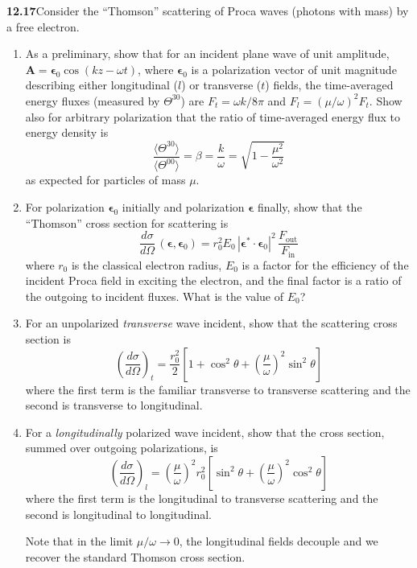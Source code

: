 \par\bigskip
\noindent\textbf{12.17}\quad Consider the ``Thomson'' scattering of Proca waves (photons with mass) by a free electron.
\begin{enumerate}
\item[(a)] As a preliminary, show that for an incident plane wave of unit amplitude, $\mathbf{A}=\boldsymbol{\epsilon}_{0}\cos(kz-\omega t)$, where $\boldsymbol{\epsilon}_{0}$ is a polarization vector of unit magnitude describing either longitudinal ($l$) or transverse ($t$) fields, the time-averaged energy fluxes (measured by $\Theta^{30}$) are $F_{t}=\omega k/8\pi$ and $F_{l}=(\mu/\omega)^{2}F_{t}$. Show also for arbitrary polarization that the ratio of time-averaged energy flux to energy density is
\[
\frac{\langle\Theta^{30}\rangle}{\langle\Theta^{00}\rangle}=\beta=\frac{k}{\omega}=\sqrt{1-\frac{\mu^{2}}{\omega^{2}}}
\]
as expected for particles of mass $\mu$.
\item[(b)] For polarization $\boldsymbol{\epsilon}_{0}$ initially and polarization $\boldsymbol{\epsilon}$ finally, show that the ``Thomson'' cross section for scattering is
\[
\frac{d\sigma}{d\Omega}\,(\boldsymbol{\epsilon},\boldsymbol{\epsilon}_{0})=r_{0}^{2}E_{0}\,|\boldsymbol{\epsilon}^{*}\cdot\boldsymbol{\epsilon}_{0}|^{2}\,\frac{F_{\mathrm{out}}}{F_{\mathrm{in}}}
\]
where $r_{0}$ is the classical electron radius, $E_{0}$ is a factor for the efficiency of the incident Proca field in exciting the electron, and the final factor is a ratio of the outgoing to incident fluxes. What is the value of $E_{0}$?
\item[(c)] For an unpolarized \emph{transverse} wave incident, show that the scattering cross section is
\[
\left(\frac{d\sigma}{d\Omega}\right)_{t}=\frac{r_{0}^{2}}{2}\left[1+\cos^{2}\theta+\left(\frac{\mu}{\omega}\right)^{2}\sin^{2}\theta\right]
\]
where the first term is the familiar transverse to transverse scattering and the second is transverse to longitudinal.
\item[(d)] For a \emph{longitudinally} polarized wave incident, show that the cross section, summed over outgoing polarizations, is
\[
\left(\frac{d\sigma}{d\Omega}\right)_{l}=\left(\frac{\mu}{\omega}\right)^{2}r_{0}^{2}\!\left[\sin^{2}\theta+\left(\frac{\mu}{\omega}\right)^{2}\cos^{2}\theta\right]
\]
where the first term is the longitudinal to transverse scattering and the second is longitudinal to longitudinal.

Note that in the limit $\mu/\omega\to0$, the longitudinal fields decouple and we recover the standard Thomson cross section.
\end{enumerate}
\solution

